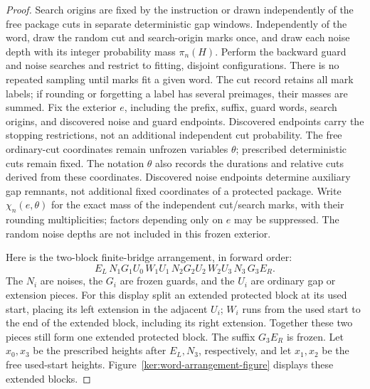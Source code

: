 \documentclass[11pt]{article}
\numberwithin{equation}{section}
\theoremstyle{definition}
\theoremstyle{remark}
\newcommand{\1}{\mathbf 1}
\begin{document}
\begin{proof}
Search origins are fixed by the instruction or drawn independently
of the free package cuts in separate deterministic gap windows.
Independently of the word, draw the random cut and search-origin marks once,
and draw each noise depth with its integer probability mass
\(\pi_n(H)\).  Perform the backward guard and noise searches and
restrict to fitting, disjoint configurations.  There is no repeated
sampling until marks fit a given word.  The cut record retains all
mark labels; if rounding or forgetting a label has several preimages,
their masses are summed.  Fix the exterior \(e\), including the
prefix, suffix, guard words, search origins, and discovered noise and
guard endpoints.  Discovered endpoints carry the stopping restrictions,
not an additional independent cut probability. The free ordinary-cut
coordinates remain unfrozen variables \(\theta\); prescribed
deterministic cuts remain fixed. The notation \(\theta\) also records
the durations and relative cuts derived from these coordinates.
Discovered noise endpoints determine auxiliary gap remnants, not
additional fixed coordinates of a protected package.
Write \(\chi_n(e,\theta)\) for the exact mass of the independent
cut/search marks, with their rounding multiplicities; factors depending
only on \(e\) may be suppressed.  The random noise depths are not
included in this frozen exterior.

Here is the two-block finite-bridge arrangement, in forward order:
\begin{equation}\label{ker:two-block-word}
 E_L\,N_1G_1U_0\,W_1U_1\,N_2G_2U_2\,W_2U_3\,N_3\,G_3E_R.
\end{equation}
The \(N_i\) are noises, the \(G_i\) are frozen guards, and the
\(U_i\) are ordinary gap or extension pieces.  For this display split
an extended protected block at its used start, placing its left
extension in the adjacent \(U_i\); \(W_i\) runs from the used start
to the end of the extended block, including its right extension.
Together these two pieces still form one extended protected block.
The suffix \(G_3E_R\) is frozen.
Let \(x_0,x_3\) be the prescribed heights after \(E_L,N_3\),
respectively, and let \(x_1,x_2\) be the free used-start heights.
Figure~\ref{ker:word-arrangement-figure} displays these extended blocks.


\end{proof}
\end{document}
